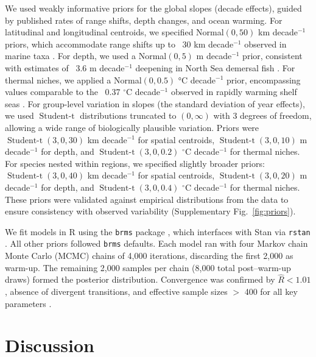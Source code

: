 \documentclass[lineno,pdflatex,sn-nature]{sn-jnl}%
\begin{document}
We used weakly informative priors for the global slopes (decade effects), guided by published rates of range shifts, depth changes, and ocean warming. For latitudinal and longitudinal centroids, we specified Normal$(0, 50)$ km decade$^{-1}$ priors, which accommodate range shifts up to ~30 km decade$^{-1}$ observed in marine taxa \citep{poloczanska_global_2013}. For depth, we used a Normal$(0, 5)$ m decade$^{-1}$ prior, consistent with estimates of ~3.6 m decade$^{-1}$ deepening in North Sea demersal fish \citep{dulvy_climate_2008}. For thermal niches, we applied a Normal$(0, 0.5)$ °C decade$^{-1}$ prior, encompassing values comparable to the ~0.37 $^\circ$C decade$^{-1}$ observed in rapidly warming shelf seas \citep{chen_longterm_2020}.
For group-level variation in slopes (the standard deviation of year effects), we used $\operatorname{Student-t}$ distributions truncated to $(0,\infty)$ with 3 degrees of freedom, allowing a wide range of biologically plausible variation. Priors were $\operatorname{Student-t}(3, 0, 30)$ km decade$^{-1}$ for spatial centroids, $\operatorname{Student-t}(3, 0, 10)$ m decade$^{-1}$ for depth, and $\operatorname{Student-t}(3, 0, 0.2)$ $^\circ$C decade$^{-1}$ for thermal niches. For species nested within regions, we specified slightly broader priors: $\operatorname{Student-t}(3, 0, 40)$ km decade$^{-1}$ for spatial centroids, $\operatorname{Student-t}(3, 0, 20)$ m decade$^{-1}$ for depth, and $\operatorname{Student-t}(3, 0, 0.4)$ $^\circ$C decade$^{-1}$ for thermal niches. These priors were validated against empirical distributions from the data to ensure consistency with observed variability (Supplementary Fig.~\ref{fig:priors}).

We fit models in R using the \texttt{brms} package \citep{burkner_brms_2017}, which interfaces with Stan via \texttt{rstan} \citep{stan2024,stan_development_team_rstan_2024}. All other priors followed \texttt{brms} defaults. Each model ran with four Markov chain Monte Carlo (MCMC) chains of 4,000 iterations, discarding the first 2,000 as warm-up. The remaining 2,000 samples per chain (8,000 total post–warm-up draws) formed the posterior distribution. Convergence was confirmed by $\hat{R} < 1.01$, absence of divergent transitions, and effective sample sizes $>$ 400 for all key parameters \citep{vehtari_rank-normalization_2021}.

\section{Discussion}\label{sec12}
\end{document}
